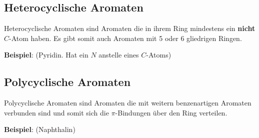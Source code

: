 \subsection{Heterocyclische Aromaten} 
\label{sec:heteroaromaten}
Heterocyclische Aromaten sind Aromaten die in ihrem Ring mindestens ein \textbf{nicht} $C$-Atom haben. 
Es gibt somit auch Aromaten mit 5 oder 6 gliedrigen Ringen.

\textbf{Beispiel}: (Pyridin. Hat ein $N$ anstelle eines $C$-Atoms) 



\subsection{Polycyclische Aromaten} 
\label{sec:polyaromaten}
Polycyclische Aromaten sind Aromaten die mit weitern benzenartigen Aromaten verbunden sind und somit sich die $\pi$-Bindungen über den Ring verteilen.

\textbf{Beispiel}: (Naphthalin)


